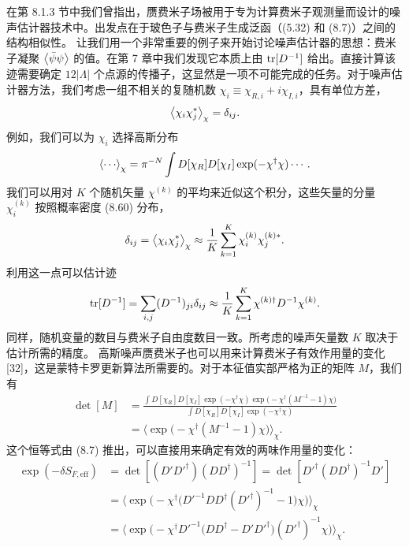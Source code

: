 在第 8.1.3 节中我们曾指出，赝费米子场被用于专为计算费米子观测量而设计的噪声估计器技术中。出发点在于玻色子与费米子生成泛函（(5.32) 和 (8.7)）之间的结构相似性。
让我们用一个非常重要的例子来开始讨论噪声估计器的思想：费米子凝聚 $\left\langle \bar{\psi}\psi \right\rangle$ 的值。在第 7 章中我们发现它本质上由 $\operatorname{tr}[D^{-1}]$ 给出。直接计算该迹需要确定 $12|\Lambda|$ 个点源的传播子，这显然是一项不可能完成的任务。对于噪声估计器方法，我们考虑一组不相关的复随机数 $\chi_i \equiv \chi_{R,i} + i\chi_{I,i}$，具有单位方差，
\begin{equation}
\left\langle \chi_i\chi_j^* \right\rangle_\chi = \delta_{ij}.
\end{equation}
例如，我们可以为 $\chi_i$ 选择高斯分布
\begin{equation}
\ev{\cdots}_\chi = \pi^{-N}\int D[\chi_R]D[\chi_I]\exp(-\chi^\dagger\chi)\cdots.
\end{equation}
我们可以用对 $K$ 个随机矢量 $\chi^{(k)}$ 的平均来近似这个积分，这些矢量的分量 $\chi_i^{(k)}$ 按照概率密度 (8.60) 分布，
\begin{equation}
\delta_{ij} = \left\langle \chi_i\chi_j^* \right\rangle_\chi \approx \frac{1}{K}\sum_{k=1}^{K}\chi_i^{(k)}\chi_j^{(k)*}.
\end{equation}
利用这一点可以估计迹
\begin{equation}
\operatorname{tr}[D^{-1}] = \sum_{i,j}(D^{-1})_{ji}\delta_{ij}
\approx \frac{1}{K}\sum_{k=1}^{K}\chi^{(k)\dagger}D^{-1}\chi^{(k)}.
\end{equation}
同样，随机变量的数目与费米子自由度数目一致。所考虑的噪声矢量数 $K$ 取决于估计所需的精度。
高斯噪声赝费米子也可以用来计算费米子有效作用量的变化 [32]，这是蒙特卡罗更新算法所需要的。对于本征值实部严格为正的矩阵 $M$，我们有
\begin{equation}
\begin{split}
\det[M] &= \frac{\int D[\chi_R]D[\chi_I]\exp(-\chi^\dagger\chi)\exp\big(-\chi^\dagger(M^{-1}-1)\chi\big)}
        {\int D[\chi_R]D[\chi_I]\exp(-\chi^\dagger\chi)}\\
&= \Big\langle\exp\big(-\chi^\dagger(M^{-1}-1)\chi\big)\Big\rangle_\chi .
\end{split}
\end{equation}
这个恒等式由 (8.7) 推出，可以直接用来确定有效的两味作用量的变化：
\begin{equation}
\begin{split}
\exp(-\delta S_{F,\mathrm{eff}}) &= \det[(D'D'^\dagger)(DD^\dagger)^{-1}]
  = \det[D'^\dagger(DD^\dagger)^{-1}D']\\
&= \Big\langle\exp\big(-\chi^\dagger\big(D'^{-1}DD^\dagger(D'^\dagger)^{-1}-1\big)\chi\big)\Big\rangle_\chi\\
&= \Big\langle\exp\big(-\chi^\dagger D'^{-1}\big(DD^\dagger - D'D'^\dagger\big)(D'^\dagger)^{-1}\chi\big)\Big\rangle_\chi .
\end{split}
\end{equation}
